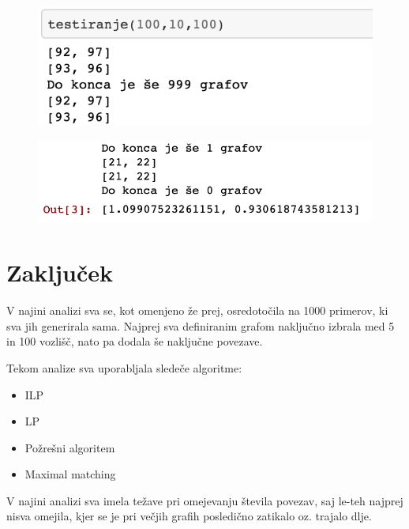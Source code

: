 \documentclass[12pt,a4paper]{amsart}
\theoremstyle{definition} %
\theoremstyle{plain} %
\begin{document}
\begin{figure}[ht]
\centering
\includegraphics[width=.6\textwidth]{Screen7.png}
\end{figure}



\begin{figure}[ht]
\centering
\includegraphics[width=.7\textwidth]{Screen8.png}
\end{figure}


\newpage



\section{Zaključek}

V najini analizi sva se, kot omenjeno že prej, osredotočila na 1000 primerov, ki sva jih generirala sama. Najprej sva definiranim grafom naključno izbrala med 5 in 100 vozlišč, nato pa dodala še naključne povezave.

\hspace*{\fill} %


Tekom analize sva uporabljala sledeče algoritme:
\begin{itemize}
\item ILP
\item LP
\item Požrešni algoritem
\item Maximal matching

 \end{itemize}

 \hspace*{\fill} %


V najini analizi sva imela težave pri omejevanju števila povezav, saj le-teh najprej nisva omejila, kjer se je pri večjih grafih posledično zatikalo oz. trajalo dlje. 
\end{document}
